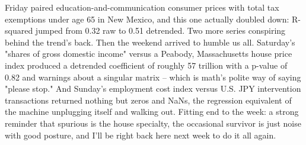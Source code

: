 Friday paired education-and-communication consumer prices with total tax exemptions under age 65 in New Mexico, and this one actually doubled down: R-squared jumped from 0.32 raw to 0.51 detrended. Two more series conspiring behind the trend's back. Then the weekend arrived to humble us all. Saturday's "shares of gross domestic income" versus a Peabody, Massachusetts house price index produced a detrended coefficient of roughly 57 trillion with a p-value of 0.82 and warnings about a singular matrix -- which is math's polite way of saying "please stop." And Sunday's employment cost index versus U.S. JPY intervention transactions returned nothing but zeros and NaNs, the regression equivalent of the machine unplugging itself and walking out. Fitting end to the week: a strong reminder that spurious is the house specialty, the occasional survivor is just noise with good posture, and I'll be right back here next week to do it all again.

